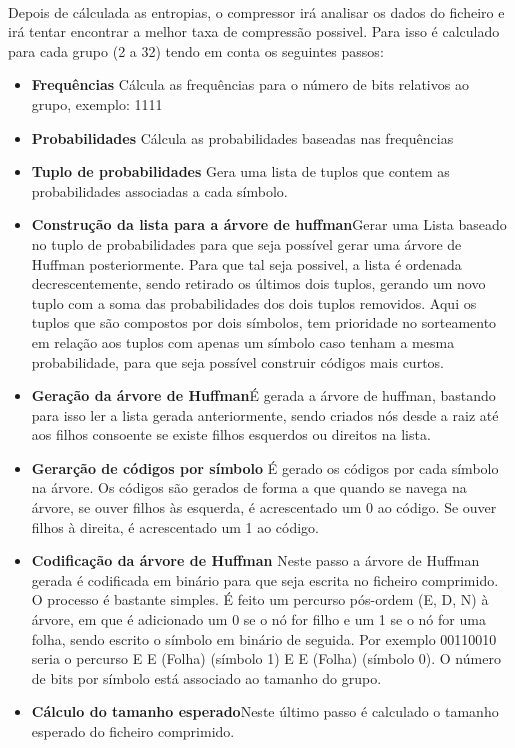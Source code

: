 \documentclass[paper=a4, fontsize=11pt]{scrartcl}
\numberwithin{equation}{section}		%
\numberwithin{figure}{section}			%
\numberwithin{table}{section}				%
\begin{document}
\paragraph{}
Depois de cálculada as entropias, o compressor irá analisar os dados do ficheiro e irá tentar encontrar a melhor taxa de compressão possivel. Para isso é calculado para cada grupo (2 a 32) tendo em conta os seguintes passos:
\begin{itemize}
\item \textbf{Frequências} Cálcula as frequências para o número de bits relativos ao grupo, exemplo: 1111
\item \textbf{Probabilidades} Cálcula as probabilidades baseadas nas frequências
\item \textbf{Tuplo de probabilidades} Gera uma lista de tuplos que contem as probabilidades associadas a cada símbolo.
\item \textbf{Construção da lista para a árvore de huffman}Gerar uma Lista baseado no tuplo de probabilidades para que seja possível gerar uma árvore de Huffman posteriormente. Para que tal seja possivel, a lista é ordenada decrescentemente, sendo retirado os últimos dois tuplos, gerando um novo tuplo com a soma das probabilidades dos dois tuplos removidos. Aqui os tuplos que são compostos por dois símbolos, tem prioridade no sorteamento em relação aos tuplos com apenas um símbolo caso tenham a mesma probabilidade, para que seja possível construir códigos mais curtos.

\item \textbf{Geração da árvore de Huffman}É gerada a árvore de huffman, bastando para isso ler a lista gerada anteriormente, sendo criados nós desde a raiz até aos filhos consoente se existe filhos esquerdos ou direitos na lista.
\item \textbf{Gerarção de códigos por símbolo} É gerado os códigos por cada símbolo na árvore. Os códigos são gerados de forma a que quando se navega na árvore, se ouver filhos às esquerda, é acrescentado um 0 ao código. Se ouver filhos à direita, é acrescentado um 1 ao código.
\item \textbf{Codificação da árvore de Huffman} Neste passo a árvore de Huffman gerada é codificada em binário para que seja escrita no ficheiro comprimido. O processo é bastante simples. É feito um percurso pós-ordem (E, D, N) à árvore, em que é adicionado um 0 se o nó for filho e um 1 se o nó for uma folha, sendo escrito o símbolo em binário de seguida.
Por exemplo 00110010 seria o percurso E E (Folha) (símbolo 1) E E (Folha) (símbolo 0). O número de bits por símbolo está associado ao tamanho do grupo.
\item \textbf{Cálculo do tamanho esperado}Neste último passo é calculado o tamanho esperado do ficheiro comprimido. 
\end{itemize}
\end{document}
